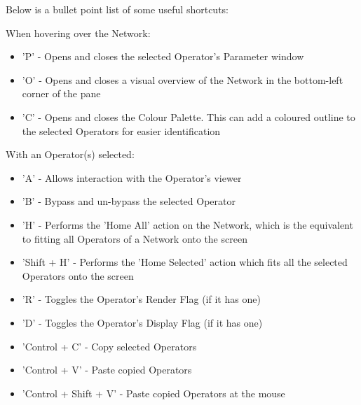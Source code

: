 \begin{fullwidth}

Below is a bullet point list of some useful shortcuts:

\vspace{3mm}

\noindent When hovering over the Network:
\begin{itemize}
\item 'P' - Opens and closes the selected Operator's Parameter window
\item 'O' - Opens and closes a visual overview of the Network in the bottom-left corner of the pane
\item 'C' - Opens and closes the Colour Palette. This can add a coloured outline to the selected Operators for easier identification
\end{itemize}

\vspace{3mm}

\noindent With an Operator(s) selected:
\begin{itemize}
\item 'A' - Allows interaction with the Operator's viewer
\item 'B' - Bypass and un-bypass the selected Operator
\item 'H' - Performs the 'Home All' action on the Network, which is the equivalent to fitting all Operators of a Network onto the screen 
\item 'Shift + H' - Performs the 'Home Selected' action which fits all the selected Operators onto the screen 
\item 'R' - Toggles the Operator's Render Flag (if it has one)
\item 'D' - Toggles the Operator's Display Flag (if it has one)
\item 'Control + C' - Copy selected Operators
\item 'Control + V' - Paste copied Operators
\item 'Control + Shift + V' - Paste copied Operators at the mouse
\end{itemize}

\vspace{3mm}


\end{fullwidth}
